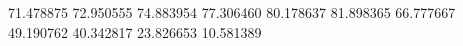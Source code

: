71.478875
72.950555
74.883954
77.306460
80.178637
81.898365
66.777667
49.190762
40.342817
23.826653
10.581389
